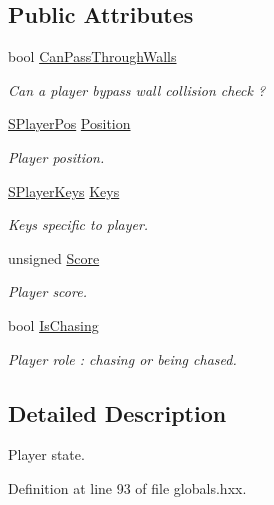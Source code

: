 \subsection*{Public Attributes}
\begin{DoxyCompactItemize}
\item 
bool \hyperlink{struct_chase_game_1_1_s_player_state_acd7030969c414605901e551171078bb1}{Can\-Pass\-Through\-Walls}
\begin{DoxyCompactList}\small\item\em Can a player bypass wall collision check ? \end{DoxyCompactList}\item 
\hyperlink{struct_chase_game_1_1_s_player_pos}{S\-Player\-Pos} \hyperlink{struct_chase_game_1_1_s_player_state_a0a68b95a4255f2a543675f88b00847b4}{Position}
\begin{DoxyCompactList}\small\item\em Player position. \end{DoxyCompactList}\item 
\hyperlink{struct_chase_game_1_1_s_player_keys}{S\-Player\-Keys} \hyperlink{struct_chase_game_1_1_s_player_state_a3fc9ce0322ed28ff9c401983d91c69f2}{Keys}
\begin{DoxyCompactList}\small\item\em Keys specific to player. \end{DoxyCompactList}\item 
unsigned \hyperlink{struct_chase_game_1_1_s_player_state_a268594c795a70cf1eb9fe6061bfa57d0}{Score}
\begin{DoxyCompactList}\small\item\em Player score. \end{DoxyCompactList}\item 
bool \hyperlink{struct_chase_game_1_1_s_player_state_a2574de666d4744daefd7824b1c3c809f}{Is\-Chasing}
\begin{DoxyCompactList}\small\item\em Player role \-: chasing or being chased. \end{DoxyCompactList}\end{DoxyCompactItemize}


\subsection{Detailed Description}
Player state. 

Definition at line 93 of file globals.\-hxx.



